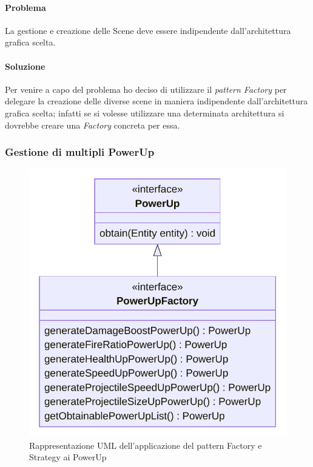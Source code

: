 \documentclass[a4paper,12pt]{report}
\begin{document}
\paragraph{Problema} La gestione e creazione delle Scene deve essere indipendente dall'architettura grafica scelta.

\paragraph{Soluzione} Per venire a capo del problema ho deciso di utilizzare il \textit{pattern Factory} per delegare la creazione delle diverse scene in maniera indipendente dall'architettura grafica scelta; infatti se si volesse utilizzare una determinata architettura si dovrebbe creare una \textit{Factory} concreta per essa.

\subsubsection{Gestione di multipli PowerUp}

\begin{figure}[H]
\centering{}
\includegraphics[scale=0.75]{img/PowerUpUML}
\caption{Rappresentazione UML dell'applicazione del pattern Factory e Strategy ai PowerUp}
\label{img:powerUp}
\end{figure}
\end{document}

